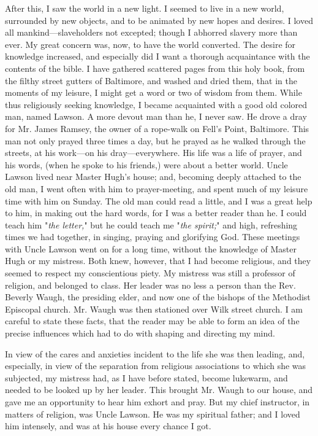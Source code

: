 After this, I saw the world in a new light. I {}seemed to live in a new
world, surrounded by new objects, and to be animated by new hopes and
desires. I loved all mankind---slaveholders not excepted; though I
abhorred slavery more than ever. My great concern was, now, to have the
world converted. The desire for knowledge increased, and especially did
I want a thorough acquaintance with the contents of the bible. I have
gathered scattered pages from this holy book, from the filthy street
gutters of Baltimore, and washed and dried them, that in the moments of
my leisure, I might get a word or two of wisdom from them. While thus
religiously seeking knowledge, I became acquainted with a good old
colored man, named Lawson. A more devout man than he, I never saw. He
drove a dray for Mr. James Ramsey, the owner of a rope-walk on Fell's
Point, Baltimore. This man not only prayed three times a day, but he
prayed as he walked through the streets, at his work---on his
dray---everywhere. His life was a life of prayer, and his words, (when
he spoke to his friends,) were about a better world. Uncle Lawson lived
near Master Hugh's house; and, becoming deeply attached to the old man,
I went often with him to prayer-meeting, and spent much of my leisure
time with him on Sunday. The old man could read a little, and I was a
great help to him, in making out the hard words, for I was a better
reader than he. I could teach him "\emph{the letter,}" but he could
teach me "\emph{the spirit;}" and high, refreshing times we had
together, in singing, praying and glorifying God. These meetings with
Uncle Lawson went on for a long time, without the knowledge of Master
Hugh or {}my mistress. Both knew, however, that I had become religious,
and they seemed to respect my conscientious piety. My mistress was still
a professor of religion, and belonged to class. Her leader was no less a
person than the Rev. Beverly Waugh, the presiding elder, and now one of
the bishops of the Methodist Episcopal church. Mr. Waugh was then
stationed over Wilk street church. I am careful to state these facts,
that the reader may be able to form an idea of the precise influences
which had to do with shaping and directing my mind.

In view of the cares and anxieties incident to the life she was then
leading, and, especially, in view of the separation from religious
associations to which she was subjected, my mistress had, as I have
before stated, become lukewarm, and needed to be looked up by her
leader. This brought Mr. Waugh to our house, and gave me an opportunity
to hear him exhort and pray. But my chief instructor, in matters of
religion, was Uncle Lawson. He was my spiritual father; and I loved him
intensely, and was at his house every chance I got.

